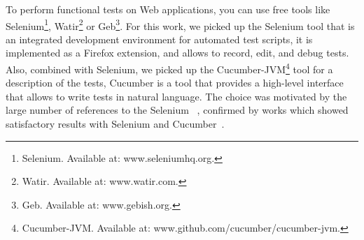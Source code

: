 \documentclass[runningheads,a4paper]{llncs}
\begin{document}

To perform functional tests on Web applications, you can use free tools like Selenium\footnote{Selenium. Available at: www.seleniumhq.org.}, Watir\footnote{Watir. Available at: www.watir.com.} or Geb\footnote{Geb. Available at: www.gebish.org.}. For this work, we picked up the Selenium tool that is an integrated development environment for automated test scripts, it is implemented as a Firefox extension, and allows to record, edit, and debug tests. Also, combined with Selenium, we picked up the Cucumber-JVM\footnote{Cucumber-JVM. Available at: www.github.com/cucumber/cucumber-jvm.} tool for a description of the tests, Cucumber is a tool that provides a high-level interface that allows to write tests in natural language. The choice was motivated by the large number of references to the Selenium ~\cite{testautomationframework,automatingfunctionaltests}, confirmed by works which showed satisfactory results with Selenium and Cucumber~\cite{cucumberandselenium,sbqs2013}.

\end{document}
